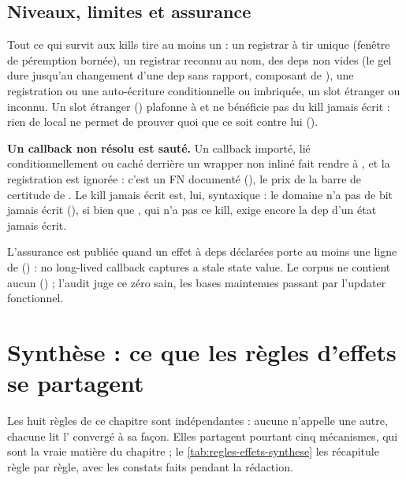 \subsection{Niveaux, limites et assurance}

Tout ce qui survit aux kills tire au moins un \Warning{} : un registrar à tir unique (fenêtre de péremption bornée), un registrar reconnu au nom, des deps non vides (le gel dure jusqu'au changement d'une dep sans rapport, composant  de ), une registration ou une auto-écriture conditionnelle ou imbriquée, un slot étranger ou inconnu. Un slot étranger () plafonne à \Warning{} et ne bénéficie pas du kill \og jamais écrit\fg{} : rien de local ne permet de prouver quoi que ce soit contre lui ().

\begin{piege}
\textbf{Un callback non résolu est sauté.} Un callback importé, lié conditionnellement ou caché derrière un wrapper non inliné fait rendre  à , et la registration est ignorée : c'est un FN documenté (), le prix de la barre de certitude de . Le kill \og jamais écrit\fg{} est, lui, syntaxique : le domaine n'a pas de bit \og jamais écrit\fg{} (), si bien que , qui n'a pas ce kill, exige encore la dep d'un état jamais écrit.
\end{piege}

L'assurance est publiée quand un effet à deps déclarées porte au moins une ligne de  () : \og no long-lived callback captures a stale state value\fg{}. Le corpus ne contient aucun  () ; l'audit juge ce zéro sain, les bases maintenues passant par l'updater fonctionnel.


\section{Synthèse : ce que les règles d'effets se partagent}
\label{sec:regles-effets-synthese}

Les huit règles de ce chapitre sont indépendantes : aucune n'appelle une autre, chacune lit l' convergé à sa façon. Elles partagent pourtant cinq mécanismes, qui sont la vraie matière du chapitre ; le \cref{tab:regles-effets-synthese} les récapitule règle par règle, avec les constats faits pendant la rédaction.

